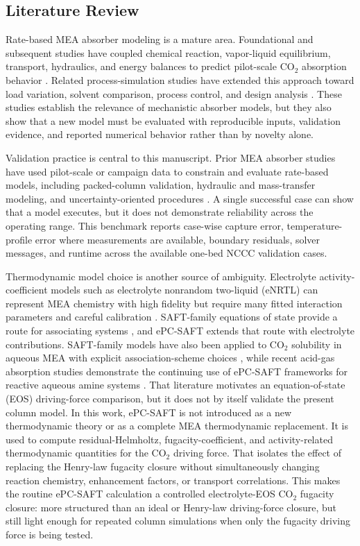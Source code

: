         \subsection{Literature Review}

        Rate-based MEA absorber modeling is a mature area. Foundational and subsequent studies have coupled chemical reaction, vapor-liquid equilibrium, transport, hydraulics, and energy balances to predict pilot-scale CO$_2$ absorption behavior \cite{Freguia2003,Mores2012,Zhang2009}. Related process-simulation studies have extended this approach toward load variation, solvent comparison, process control, and design analysis \cite{Moioli2012,Harun2012a,Greer2008,Rodriguez2014}. These studies establish the relevance of mechanistic absorber models, but they also show that a new model must be evaluated with reproducible inputs, validation evidence, and reported numerical behavior rather than by novelty alone.

        Validation practice is central to this manuscript. Prior MEA absorber studies have used pilot-scale or campaign data to constrain and evaluate rate-based models, including packed-column validation, hydraulic and mass-transfer modeling, and uncertainty-oriented procedures \cite{Razi2013,Chinen2018,Morgan2018,Morgan2020}. A single successful case can show that a model executes, but it does not demonstrate reliability across the operating range. This benchmark reports case-wise capture error, temperature-profile error where measurements are available, boundary residuals, solver messages, and runtime across the available one-bed NCCC validation cases.

        Thermodynamic model choice is another source of ambiguity. Electrolyte activity-coefficient models such as electrolyte nonrandom two-liquid (eNRTL) can represent MEA chemistry with high fidelity but require many fitted interaction parameters and careful calibration \cite{Zhang2011}. SAFT-family equations of state provide a route for associating systems \cite{Gross2001,Cameretti2005}, and ePC-SAFT extends that route with electrolyte contributions. SAFT-family models have also been applied to CO$_2$ solubility in aqueous MEA with explicit association-scheme choices \cite{Baygi2015,Najafloo2018}, while recent acid-gas absorption studies demonstrate the continuing use of ePC-SAFT frameworks for reactive aqueous amine systems \cite{Cleeton2020,Bulow2021a}. That literature motivates an equation-of-state (EOS) driving-force comparison, but it does not by itself validate the present column model. In this work, ePC-SAFT is not introduced as a new thermodynamic theory or as a complete MEA thermodynamic replacement. It is used to compute residual-Helmholtz, fugacity-coefficient, and activity-related thermodynamic quantities for the CO$_2$ driving force. That isolates the effect of replacing the Henry-law fugacity closure without simultaneously changing reaction chemistry, enhancement factors, or transport correlations. This makes the routine ePC-SAFT calculation a controlled electrolyte-EOS CO$_2$ fugacity closure: more structured than an ideal or Henry-law driving-force closure, but still light enough for repeated column simulations when only the fugacity driving force is being tested.

